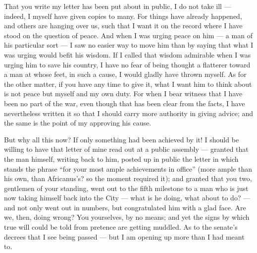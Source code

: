 

 That you write my letter has been put about in public, I do not take ill --- indeed, I myself have given copies to many. For things have already happened, and others are hanging over us, such that I want it on the record where I have stood on the question of peace. And when I was urging peace on him --- a man of his particular sort --- I saw no easier way to move him than by saying that what I was urging would befit his wisdom. If I called that wisdom admirable when I was urging him to save his country, I have no fear of being thought a flatterer toward a man at whose feet, in such a cause, I would gladly have thrown myself. As for the other matter, if you have any time to give it, what I want him to think about is not peace but myself and my own duty. For when I bear witness that I have been no part of the war, even though that has been clear from the facts, I have nevertheless written it so that I should carry more authority in giving advice; and the same is the point of my approving his cause.

 But why all this now? If only something had been achieved by it! I should be willing to have that letter of mine read out at a public assembly --- granted that the man himself, writing back to him, posted up in public the letter in which stands the phrase ``for your most ample achievements in office'' (more ample than his own, than Africanus's? so the moment required it); and granted that you two, gentlemen of your standing, went out to the fifth milestone to a man who is just now taking himself back into the City --- what is he doing, what about to do? --- and not only went out in numbers, but congratulated him with a glad face. Are we, then, doing wrong? You yourselves, by no means; and yet the signs by which true will could be told from pretence are getting muddled. As to the senate's decrees that I see being passed --- but I am opening up more than I had meant to.

